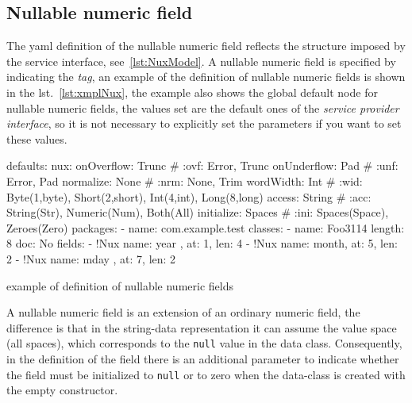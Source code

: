 \subsection{Nullable numeric field} \label{sub:yaml.nux}
The yaml definition of the nullable numeric field reflects the structure imposed 
by the service interface, see~\ref{lst:NuxModel}. 
A nullable numeric field is specified by indicating the 
 \textsl{tag}, an example of the 
definition of nullable numeric fields is shown in the lst.~\ref{lst:xmplNux}, 
the example also shows the global default node for nullable numeric fields, the 
values set are the default ones of the \textsl{service provider interface}, so 
it is not necessary to explicitly set the parameters if you want to set these 
values.

\begin{elisting}[!htb]
\begin{yamlcode}
defaults:
  nux:
    onOverflow: Trunc   # :ovf: Error, Trunc
    onUnderflow: Pad    # :unf: Error, Pad
    normalize: None     # :nrm: None, Trim
    wordWidth: Int      # :wid: Byte(1,byte), Short(2,short), Int(4,int), Long(8,long)
    access: String      # :acc: String(Str), Numeric(Num), Both(All)
    initialize: Spaces  # :ini: Spaces(Space), Zeroes(Zero)
packages:
  - name: com.example.test
    classes:
      - name: Foo3114
        length: 8
        doc: No
        fields:
          - !Nux { name: year , at: 1, len: 4 }
          - !Nux { name: month, at: 5, len: 2 }
          - !Nux { name: mday , at: 7, len: 2 }
\end{yamlcode}
\caption{example of definition of nullable numeric fields}
\label{lst:xmplNux}
\end{elisting}

A nullable numeric field is an extension of an ordinary numeric field, the 
difference is that in the string-data representation it can assume the value 
space (all spaces), which corresponds to the \texttt{null} value in the data 
class. 
Consequently, in the definition of the field there is an additional parameter to
indicate whether the field must be initialized to \texttt{null} or to zero when 
the data-class is created with the empty constructor.

